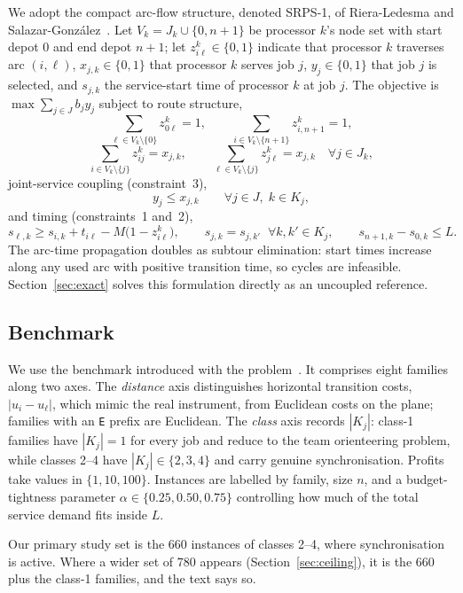 \documentclass[11pt,a4paper]{article}
\newcommand{\Kj}{\ensuremath{K_j}}
\begin{document}
We adopt the compact arc-flow structure, denoted SRPS-1, of Riera-Ledesma and
Salazar-Gonz\'alez~\cite{RieraLedesma2021SRPS}. Let $V_k=J_k\cup\{0,n+1\}$ be
processor $k$'s node set with start depot $0$ and end depot $n+1$; let
$z_{i\ell}^k\in\{0,1\}$ indicate that processor $k$ traverses arc $(i,\ell)$,
$x_{j,k}\in\{0,1\}$ that processor $k$ serves job $j$, $y_j\in\{0,1\}$ that job
$j$ is selected, and $s_{j,k}$ the service-start time of processor $k$ at job $j$.
The objective is $\max \sum_{j\in J} b_j y_j$ subject to route structure,
\[
\sum_{\ell\in V_k\setminus\{0\}} z_{0\ell}^k = 1,\qquad
\sum_{i\in V_k\setminus\{n+1\}} z_{i,n+1}^k = 1,
\]
\[
\sum_{i\in V_k\setminus\{j\}} z_{ij}^k = x_{j,k},\qquad
\sum_{\ell\in V_k\setminus\{j\}} z_{j\ell}^k = x_{j,k}
\quad \forall j\in J_k,
\]
joint-service coupling (constraint~3),
\[
y_j \le x_{j,k} \qquad \forall j\in J,\; k\in \Kj,
\]
and timing (constraints~1 and~2),
\[
s_{\ell,k} \ge s_{i,k} + t_{i\ell} - M\bigl(1-z_{i\ell}^k\bigr),
\qquad
s_{j,k}=s_{j,k'} \;\;\forall k,k'\in \Kj,
\qquad
s_{n+1,k}-s_{0,k} \le L .
\]
The arc-time propagation doubles as subtour elimination: start times increase
along any used arc with positive transition time, so cycles are infeasible.
Section~\ref{sec:exact} solves this formulation directly as an uncoupled
reference.

\subsection{Benchmark}\label{sec:benchmark}

We use the benchmark introduced with the problem~\cite{RieraLedesma2021SRPS}. It
comprises eight families along two axes. The \emph{distance} axis distinguishes
horizontal transition costs, $|u_i-u_\ell|$, which mimic the real instrument, from
Euclidean costs on the plane; families with an \texttt{E} prefix are Euclidean.
The \emph{class} axis records $|\Kj|$: class-1 families have $|\Kj|=1$ for every
job and reduce to the team orienteering problem, while classes 2--4 have
$|\Kj|\in\{2,3,4\}$ and carry genuine synchronisation. Profits take values in
$\{1,10,100\}$. Instances are labelled by family, size $n$, and a
budget-tightness parameter $\alpha\in\{0.25,0.50,0.75\}$ controlling how much of
the total service demand fits inside $L$.

Our primary study set is the 660 instances of classes 2--4, where synchronisation
is active. Where a wider set of 780 appears (Section~\ref{sec:ceiling}), it is the
660 plus the class-1 families, and the text says so.
\end{document}
